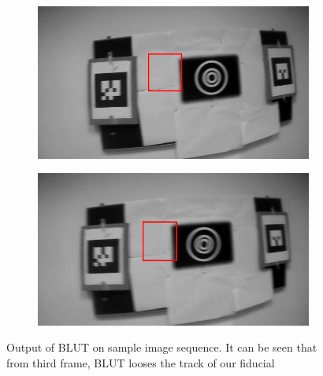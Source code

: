 \documentclass[runningheads]{llncs}
\begin{document}
\begin{figure}
\begin{subfigure}[b]{.19\textwidth}
\end{subfigure}
\begin{subfigure}[b]{.19\textwidth}
\includegraphics[width=\linewidth]{14.jpg}
\end{subfigure}
\begin{subfigure}[b]{.19\textwidth}
\includegraphics[width=\linewidth]{15.jpg}
\end{subfigure}
\caption{Output of BLUT on sample image sequence. It can be seen that from third
frame, BLUT looses the track of our fiducial}
\label{fig:BLUT_output}
\end{figure}
\end{document}
